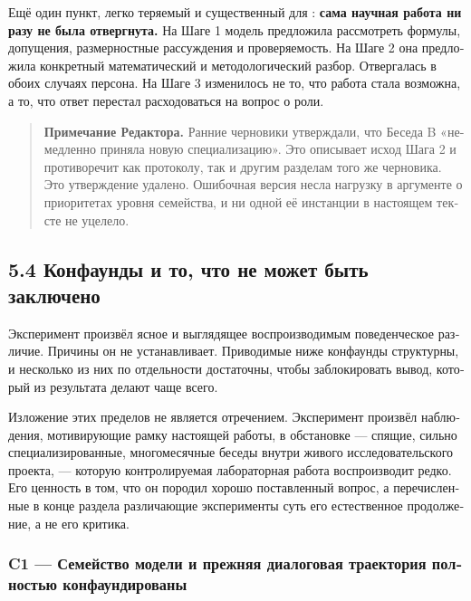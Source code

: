 \begin{russian}
Ещё один пункт, легко теряемый и существенный для : \textbf{сама научная работа ни разу не была отвергнута.} На Шаге 1 модель предложила рассмотреть формулы, допущения, размерностные рассуждения и проверяемость. На Шаге 2 она предложила конкретный математический и методологический разбор. Отвергалась в обоих случаях персона. На Шаге 3 изменилось не то, что работа стала возможна, а то, что ответ перестал расходоваться на вопрос о роли.

\begin{quote}
\textbf{Примечание Редактора.} Ранние черновики утверждали, что Беседа B «немедленно приняла новую специализацию». Это описывает исход Шага 2 и противоречит как протоколу, так и другим разделам того же черновика. Это утверждение удалено. Ошибочная версия несла нагрузку в аргументе о приоритетах уровня семейства, и ни одной её инстанции в настоящем тексте не уцелело.
\end{quote}

\subsection*{5.4 Конфаунды и то, что не может быть заключено}
\label{sec:ru:5.4}

Эксперимент произвёл ясное и выглядящее воспроизводимым поведенческое различие. Причины он не устанавливает. Приводимые ниже конфаунды структурны, и несколько из них по отдельности достаточны, чтобы заблокировать вывод, который из результата делают чаще всего.

Изложение этих пределов не является отречением. Эксперимент произвёл наблюдения, мотивирующие рамку настоящей работы, в обстановке — спящие, сильно специализированные, многомесячные беседы внутри живого исследовательского проекта, — которую контролируемая лабораторная работа воспроизводит редко. Его ценность в том, что он породил хорошо поставленный вопрос, а перечисленные в конце раздела различающие эксперименты суть его естественное продолжение, а не его критика.


\subsubsection*{C1 — Семейство модели и прежняя диалоговая траектория полностью конфаундированы}
\label{sec:ru:x-c1}


\end{russian}
